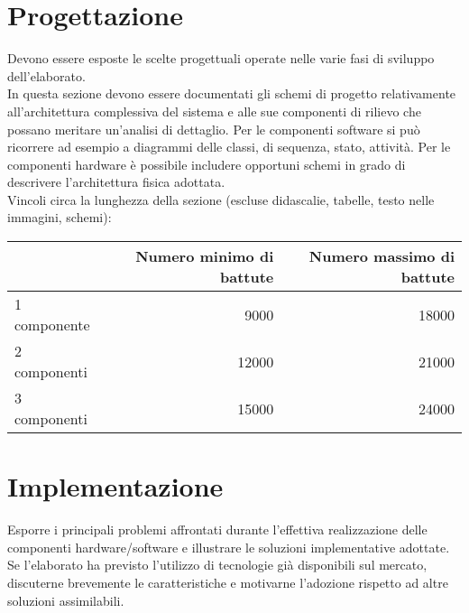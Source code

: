 \documentclass[12pt]{article}
\begin{document}
\newpage



\section{Progettazione}

Devono essere esposte le scelte progettuali operate nelle varie fasi di sviluppo dell'elaborato.\\

In questa sezione devono essere documentati gli schemi di progetto relativamente all'architettura complessiva del sistema e alle sue componenti di rilievo che possano meritare un'analisi di dettaglio. Per le componenti software si può ricorrere ad esempio a diagrammi delle classi, di sequenza, stato, attività. Per le componenti hardware è possibile includere opportuni schemi in grado di descrivere l'architettura fisica adottata.\\

Vincoli circa la lunghezza della sezione (escluse didascalie, tabelle, testo nelle immagini, schemi):

\vspace{1cm}
\begin{tabular}{l|rr}
 & Numero minimo di battute & Numero massimo di battute \\
 \hline
 1 componente & 9000 & 18000 \\
 2 componenti & 12000 & 21000 \\
 3 componenti & 15000 & 24000 \\
 \hline
\end{tabular}


\newpage



\section{Implementazione}\label{sec:implementazione}

Esporre i principali problemi affrontati durante l'effettiva realizzazione delle componenti hardware/software e illustrare le soluzioni implementative adottate. Se l'elaborato ha previsto l'utilizzo di tecnologie già disponibili sul mercato, discuterne brevemente le caratteristiche e motivarne l'adozione rispetto ad altre soluzioni assimilabili.\\
\end{document}
